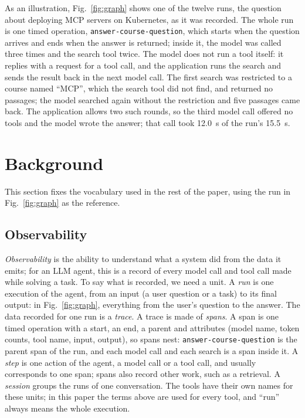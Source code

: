 \documentclass[conference]{IEEEtran}
\begin{document}
As an illustration, Fig.~\ref{fig:graph} shows one of the twelve runs, the question about deploying MCP servers on Kubernetes, as it was recorded. The whole run is one timed operation, \texttt{answer-course-question}, which starts when the question arrives and ends when the answer is returned; inside it, the model was called three times and the search tool twice. The model does not run a tool itself: it replies with a request for a tool call, and the application runs the search and sends the result back in the next model call. The first search was restricted to a course named ``MCP'', which the search tool did not find, and returned no passages; the model searched again without the restriction and five passages came back. The application allows two such rounds, so the third model call offered no tools and the model wrote the answer; that call took 12.0~s of the run's 15.5~s.

\section{Background}\label{sec:background}
This section fixes the vocabulary used in the rest of the paper, using the run in Fig.~\ref{fig:graph} as the reference.

\subsection{Observability}\label{sec:terms}
\emph{Observability} is the ability to understand what a system did from the data it emits; for an LLM agent, this is a record of every model call and tool call made while solving a task. To say what is recorded, we need a unit. A \emph{run} is one execution of the agent, from an input (a user question or a task) to its final output: in Fig.~\ref{fig:graph}, everything from the user's question to the answer. The data recorded for one run is a \emph{trace}. A trace is made of \emph{spans}. A span is one timed operation with a start, an end, a parent and attributes (model name, token counts, tool name, input, output), so spans nest: \texttt{answer-course-question} is the parent span of the run, and each model call and each search is a span inside it. A \emph{step} is one action of the agent, a model call or a tool call, and usually corresponds to one span; spans also record other work, such as a retrieval. A \emph{session} groups the runs of one conversation. The tools have their own names for these units; in this paper the terms above are used for every tool, and ``run'' always means the whole execution.
\end{document}
